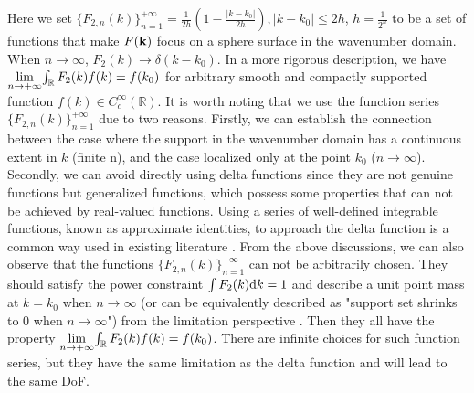\documentclass[12pt,draftclsnofoot,journal,onecolumn]{IEEEtran}
\begin{document}
	Here we set $\{F_{2,n}(k)\}_{n=1}^{+\infty} = \frac{1}{2h}\left( 1-\frac{|k-k_0|}{2h} \right), |k-k_0|\leqslant 2h$, $h = \frac{1}{2^n}$ to be a set of functions that make $F({\bf k})$ focus on a sphere surface in the wavenumber domain. When $n \rightarrow \infty$, $F_2(k) \rightarrow \delta(k-k_0)$. {\color{red} In a more rigorous description, we have $\underset{n \rightarrow +\infty}{\rm lim}{\int_{\mathbb{R}} F_2(k)f(k) } = f(k_0)$ for arbitrary smooth and compactly supported function $f(k) \in C_c^{\infty}({\mathbb R})$. It is worth noting that we use the function series $\{F_{2,n}(k)\}_{n=1}^{+\infty}$ due to two reasons. Firstly, we can establish the connection between the case where the support in the wavenumber domain has a continuous extent in $k$ (finite n), and the case localized only at the point $k_0$ ($n \rightarrow \infty$). Secondly, we can avoid directly using delta functions since they are not genuine functions but generalized functions, which possess some properties that can not be achieved by real-valued functions. Using a series of well-defined integrable functions, known as approximate identities, to approach the delta function is a common way used in existing literature \cite{strichartz2003guide}. From the above discussions, we can also observe that the functions $\{F_{2,n}(k)\}_{n=1}^{+\infty}$ can not be arbitrarily chosen. They should satisfy the power constraint $\int F_2(k) {\rm d}k = 1$ and describe a unit point mass at $k = k_0$ when $n \rightarrow \infty$ (or can be equivalently described as "support set shrinks to 0 when $n \rightarrow \infty$")
	from the limitation perspective
	\cite{wheeler1997simplified}. 
	Then they all have the property $\underset{n \rightarrow +\infty}{\rm lim}{\int_{\mathbb{R}} F_2(k)f(k) } = f(k_0)$. There are infinite choices for such function series, but they have the same limitation as the delta function \cite{wheeler1997simplified} and will lead to the same DoF.} 
	
\end{document}

